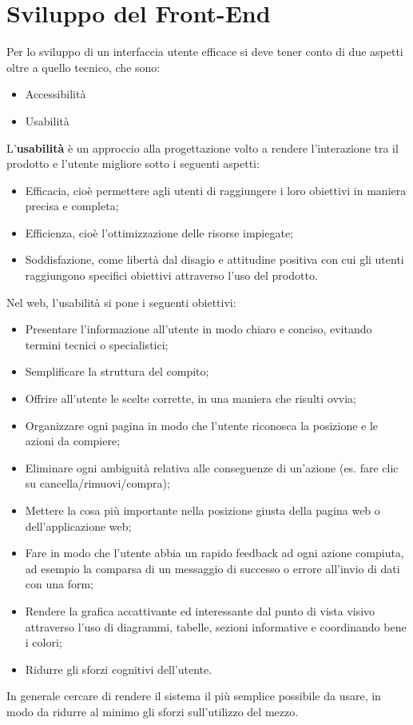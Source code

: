
\newpage

\section{Sviluppo del Front-End}

Per lo sviluppo di un interfaccia utente efficace si deve tener conto di due aspetti oltre a quello tecnico, che sono:
\begin{itemize}
\item Accessibilità
\item Usabilità
\end{itemize}

L'\textbf{usabilità} è un approccio alla progettazione volto a rendere l'interazione tra il prodotto e l'utente migliore sotto i seguenti aspetti:
\begin{itemize}
    \item Efficacia, cioè permettere agli utenti di raggiungere i loro obiettivi in maniera precisa e completa;
    \item Efficienza, cioè l'ottimizzazione delle risorse impiegate;
    \item Soddisfazione, come libertà dal disagio e attitudine positiva con cui gli utenti raggiungono specifici obiettivi attraverso l’uso del prodotto.
\end{itemize}
Nel web, l'usabilità si pone i seguenti obiettivi:
\begin{itemize}
    \item Presentare l'informazione all'utente in modo chiaro e conciso, evitando termini tecnici o specialistici;
    \item Semplificare la struttura del compito;
    \item Offrire all'utente le scelte corrette, in una maniera che risulti ovvia;
    \item Organizzare ogni pagina in modo che l'utente riconosca la posizione e le azioni da compiere;
    \item Eliminare ogni ambiguità relativa alle conseguenze di un'azione (es. fare clic su cancella/rimuovi/compra);
    \item Mettere la cosa più importante nella posizione giusta della pagina web o dell'applicazione web;
    \item Fare in modo che l'utente abbia un rapido feedback ad ogni azione compiuta, ad esempio la comparsa di un messaggio di successo o errore all'invio di dati con una form;
    \item Rendere la grafica accattivante ed interessante dal punto di vista visivo attraverso l'uso di diagrammi, tabelle, sezioni informative e coordinando bene i colori;
    \item Ridurre gli sforzi cognitivi dell'utente.
\end{itemize}
In generale cercare di rendere il sistema il più semplice possibile da usare, in modo da ridurre al minimo gli sforzi sull'utilizzo del mezzo.

